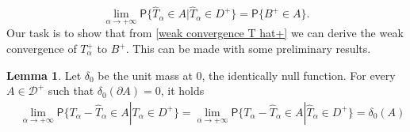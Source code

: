 \documentclass{article}
\theoremstyle{definition}
\newtheorem{lemma}{Lemma}[section]
\numberwithin{equation}{section}
\begin{document}
\begin{equation}\label{weak convergence T hat+}
\lim_{\alpha \to +\infty}\mathsf{P}\{\hat{T}_\alpha \in A|\hat{T}_\alpha \in D^+\} = \mathsf{P}\{B^+ \in A\}.
\end{equation}
Our task is to show that from \eqref{weak convergence T hat+} we can derive the weak convergence of $T_{\alpha}^+$ to $B^+$. This can be made with some preliminary results. 
\begin{lemma}\label{Lemma 1 weak convergence}
Let $\delta_0$ be the unit mass at $0$, the identically null function. For every $A \in \mathcal{D^+}$ such that $\delta_0(\partial A) = 0$, it holds 
\begin{align}
&\lim_{\alpha \to +\infty}\mathsf{P}\{T_\alpha-\hat{T}_\alpha \in A|T_\alpha \in D^+\} = \lim_{\alpha \to +\infty}\mathsf{P}\{T_\alpha-\hat{T}_\alpha \in A|\hat{T}_\alpha \in D^+\} = \delta_0(A)
\end{align}
\end{lemma}
\end{document}
